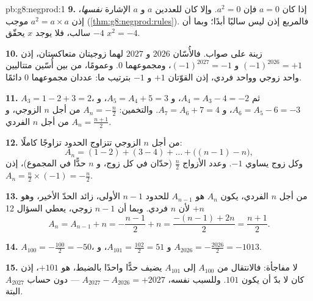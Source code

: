 \begin{solution}{pb:g8:negprod:1}
\textbf{9.} إذا كان $a = 0$ فإن $a^2 = 0$. وإلا كان للعددين $a$ و $a$
الإشارة \emph{نفسها}، إذن $a^2 = a \times a$ موجب
(\cref{thm:g8:negprod:rules}). فالمربع إذن ليس سالبًا
أبدًا؛ وبما أن $-4$ سالب، فلا يوجد  $x$ يحقّق
$x^2 = -4$.

\textbf{10.} زينة على صواب. فالأُسّان $2026$ و $2027$ لهما
زوجيتان متعاكستان، إذن $(-1)^{2026} = +1$ و $(-1)^{2027} = -1$،
ومجموعهما $0$. وعمومًا، من بين أُسّين متتاليين واحد
زوجي وواحد فردي، إذن القوّتان $+1$ و $-1$ بترتيب
ما: عددان  مجموعهما $0$ دائمًا.

\textbf{11.} $A_3 = 1 - 2 + 3 = 2$، ثم
$A_4 = A_3 - 4 = -2$، و $A_5 = A_4 + 5 = 3$، و $A_6 = A_5 - 6 = -3$،
و $A_7 = A_6 + 7 = 4$. والتخمين: $A_n = -\frac{n}{2}$ من أجل $n$ الزوجي،
و $A_n = \frac{n+1}{2}$ من أجل $n$ الفردي.

\textbf{12.} من أجل $n$ الزوجي تتزاوج الحدود تزاوجًا كاملًا:
\[
A_n = (1 - 2) + (3 - 4) + \dots + \bigl((n-1) - n\bigr),
\]
وكل زوج يساوي $-1$. وعدد الأزواج $\frac{n}{2}$ (حدّان
في كل زوج، و $n$ حدًّا في المجموع)، إذن
$A_n = \frac{n}{2} \times (-1) = -\frac{n}{2}$.

\textbf{13.} من أجل $n$ الفردي، يكون  $A_n$ هو  $A_{n-1}$ للحدود
$n - 1$ الأولى، زائد الحدّ الأخير، وهو $+n$ لأن $n$
فردي. وبما أن $n - 1$ زوجي، يعطي السؤال 12
\[
A_n = A_{n-1} + n = -\frac{n-1}{2} + n
= \frac{-(n-1) + 2n}{2} = \frac{n+1}{2} .
\]

\textbf{14.} $A_{100} = -\frac{100}{2} = -50$، \quad
و $A_{101} = \frac{102}{2} = 51$، \quad
و $A_{2026} = -\frac{2026}{2} = -1013$.

\textbf{15.} لا مفاجأة: فالانتقال من $A_{100}$ إلى $A_{101}$ يضيف
حدًّا واحدًا بالضبط، هو $+101$، إذن كان  لا بدّ أن يكون $101$.
وللسبب نفسه، $A_{2027} - A_{2026} = +2027$ --- دون
حساب $A_{2027}$ البتة.
\end{solution}
